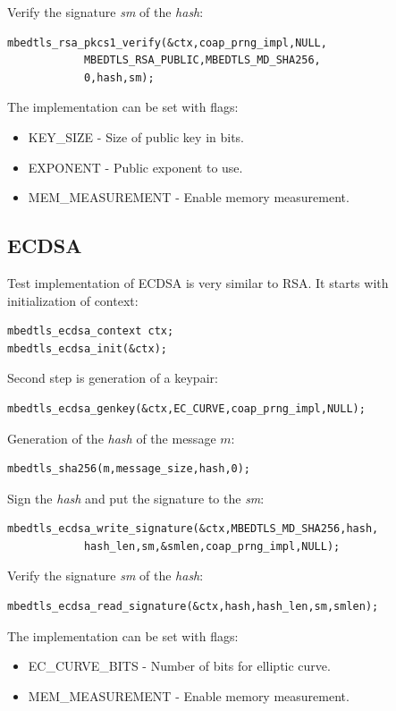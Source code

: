 \documentclass[thesis=M,english]{FITthesis}[2019/12/23]
\begin{document}
\noindent
Verify the signature \textit{sm} of the \textit{hash}:
\begin{lstlisting}[frame=single]
mbedtls_rsa_pkcs1_verify(&ctx,coap_prng_impl,NULL,
			MBEDTLS_RSA_PUBLIC,MBEDTLS_MD_SHA256,
			0,hash,sm);
\end{lstlisting}

\bigskip
\noindent
The implementation can be set with flags:
\begin{itemize}
\item	KEY\_SIZE - Size of public key in bits.
\item 	EXPONENT - Public exponent to use.
\item 	MEM\_MEASUREMENT  - Enable memory measurement.
\end{itemize}

\subsection{ECDSA}
Test implementation of ECDSA is very similar to RSA. It starts with initialization of context:
\begin{lstlisting}[frame=single]
mbedtls_ecdsa_context ctx;
mbedtls_ecdsa_init(&ctx);
\end{lstlisting}

\noindent
Second step is generation of a keypair:
\begin{lstlisting}[frame=single]
mbedtls_ecdsa_genkey(&ctx,EC_CURVE,coap_prng_impl,NULL);
\end{lstlisting}

\noindent
Generation of the \textit{hash} of the message $m$:
\begin{lstlisting}[frame=single]
mbedtls_sha256(m,message_size,hash,0);
\end{lstlisting}

\noindent
Sign the \textit{hash} and put the signature to the \textit{sm}:
\begin{lstlisting}[frame=single]
mbedtls_ecdsa_write_signature(&ctx,MBEDTLS_MD_SHA256,hash,
			hash_len,sm,&smlen,coap_prng_impl,NULL);
\end{lstlisting}

\noindent
Verify the signature \textit{sm} of the \textit{hash}:
\begin{lstlisting}[frame=single]
mbedtls_ecdsa_read_signature(&ctx,hash,hash_len,sm,smlen);
\end{lstlisting}

\bigskip
\noindent
The implementation can be set with flags:
\begin{itemize}
\item	EC\_CURVE\_BITS  - Number of bits for elliptic curve.
\item 	MEM\_MEASUREMENT  - Enable memory measurement.
\end{itemize}
\end{document}
